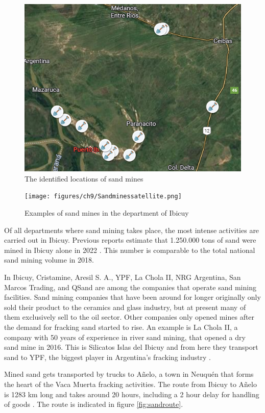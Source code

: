 \begin{figure}[H]
    \centering
    \includegraphics[width=0.6\linewidth]{figures/ch9/SandMap.png}
    \caption{The identified locations of sand mines}
    \label{fig:sandminemap}
\end{figure}

\begin{figure}[H]
    \centering
    \texttt{[image: figures/ch9/Sandminessatellite.png]}
    \caption{Examples of sand mines in the department of Ibicuy}
    \label{fig:sandminessatellite}
\end{figure}

Of all departments where sand mining takes place, the most intense activities are carried out in Ibicuy. Previous reports estimate that 1.250.000 tons of sand were mined in Ibicuy alone in 2022 \autocite{fogliaSedArena2023}. This number is comparable to the total national sand mining volume in 2018.

In Ibicuy, Cristamine, Aresil S. A., YPF, La Chola II, NRG Argentina, San Marcos Trading, and QSand are among the companies that operate sand mining facilities. Sand mining companies that have been around for longer originally only sold their product to the ceramics and glass industry, but at present many of them exclusively sell to the oil sector. Other companies only opened mines after the demand for fracking sand started to rise. An example is La Chola II, a company with 50 years of experience in river sand mining, that opened a dry sand mine in 2016. This is Silicatos Islas del Ibicuy and from here they transport sand to YPF, the biggest player in Argentina's fracking industry \autocite{fogliaSedArena2023}.

Mined sand gets transported by trucks to Añelo, a town in Neuquén that forms the heart of the Vaca Muerta fracking activities. The route from Ibicuy to Añelo is 1283 km long and takes around 20 hours, including a 2 hour delay for handling of goods \autocite{secretariadepoliticamineraArenasParaFracking2019}. The route is indicated in figure \ref{fig:sandroute}. 

